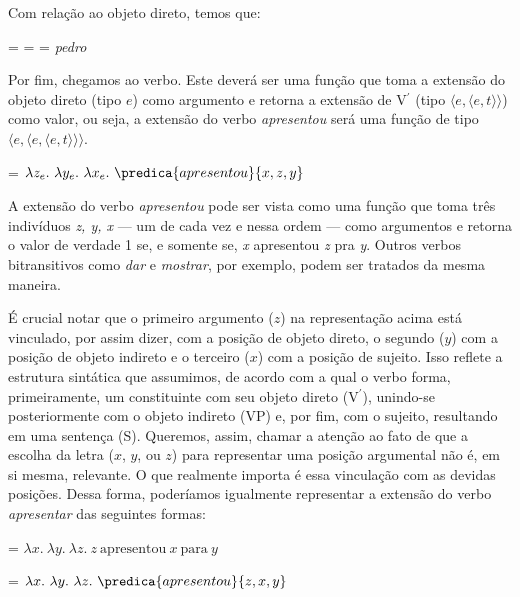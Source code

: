 \noindent Com relação ao objeto direto, temos que:

\begin{exe}
	\ex {} =  =  = \textit{pedro}
\end{exe}

\noindent Por fim, chegamos ao verbo. Este deverá ser uma função
que toma a extensão do objeto direto (tipo $e$) como argumento e
retorna a extensão de V$^{\prime}$ (tipo
$\langle e,\langle e,t \rangle\rangle$) como valor, ou seja, a extensão do
verbo \textit{apresentou} será uma função de tipo
$\langle e,\langle e,\langle e,t \rangle\rangle\rangle$.

\begin{exe}
	\ex {} = $\lambda z_{e}.\ \lambda y_{e}.\ \lambda x_{e}.\ \predica{apresentou}{x,z,y}$
\end{exe}

\noindent A extensão do verbo \textit{apresentou} pode ser vista como uma função que toma três
indivíduos \textit{z, y, x} --- um de cada vez e nessa ordem --- como argumentos e retorna o valor de
verdade 1 se, e somente se, \textit{x} apresentou \textit{z} pra
\textit{y}. Outros verbos bitransitivos como \textit{dar} e \textit{mostrar}, por
exemplo, podem ser tratados da mesma maneira.

É crucial notar que o primeiro argumento ($z$) na representação acima está vinculado, por assim dizer, com a posição de objeto direto, o segundo ($y$) com a posição de objeto indireto e o terceiro ($x$) com a posição de sujeito. Isso reflete a estrutura sintática que assumimos, de acordo com a qual o verbo forma, primeiramente, um constituinte com seu objeto direto (V$^{\prime}$), unindo-se posteriormente com o objeto indireto (VP) e, por fim, com o sujeito, resultando em uma sentença (S). Queremos, assim, chamar a atenção ao fato de que a escolha da letra ($x$, $y$, ou $z$) para representar uma posição argumental não é, em si mesma, relevante. O que realmente importa é essa vinculação com as devidas posições. Dessa forma, poderíamos igualmente representar a extensão do verbo \textit{apresentar} das seguintes formas:

\begin{exe}
	\ex {} = $\lambda x.\ \lambda y.\
\lambda z.\ z\ \text{apresentou}\ x\ \text{para}\ y$
\end{exe}

\begin{exe}
	\ex {} = $\lambda x.\ \lambda y.\ \lambda z.\ \predica{apresentou}{z,x,y}$
\end{exe}

